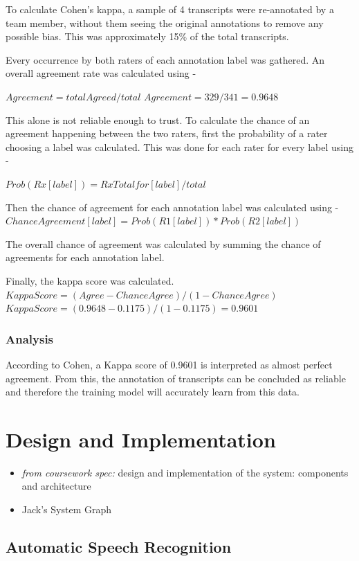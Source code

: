 \documentclass[hidelinks, 11pt]{article}
\begin{document}
To calculate Cohen's kappa, a sample of 4 transcripts were re-annotated by a team member, without them seeing the original annotations to remove any possible bias. This was approximately 15\% of the total transcripts.

Every occurrence by both raters of each annotation label was gathered. An overall agreement rate was calculated using -

$Agreement = totalAgreed / total$
$Agreement = 329/341 = 0.9648$

This alone is not reliable enough to trust.
To calculate the chance of an agreement happening between the two raters, first the probability of a rater choosing a label was calculated. This was done for each rater for every label using -

$Prob(Rx[label]) = Rx Total for [label] / total$

Then the chance of agreement for each annotation label was calculated using -
$ChanceAgreement[label] = Prob(R1[label]) * Prob(R2[label])$

The overall chance of agreement was calculated by summing the chance of agreements for each annotation label.

Finally, the kappa score was calculated.
$KappaScore = (Agree-ChanceAgree)/(1-ChanceAgree)$
$KappaScore = (0.9648-0.1175)/(1-0.1175) = 0.9601$
\subsubsection{Analysis}
According to Cohen, a Kappa score of 0.9601 is interpreted as almost perfect agreement. From this, the annotation of transcripts can be concluded as reliable and therefore the training model will accurately learn from this data.

\section{Design and Implementation}
\label{sec:implementation}

\begin{itemize}
  \item \textit{from coursework spec:} design and implementation of the system: components and architecture
  \item Jack's System Graph
\end{itemize}

\subsection{Automatic Speech Recognition}
\label{subsec:asr}
\end{document}
